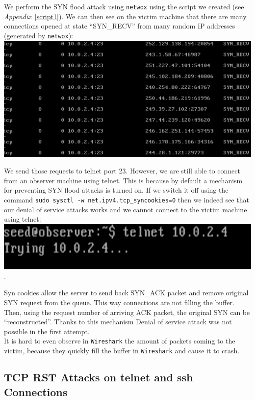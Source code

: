 \documentclass[12pt, a4paper]{article}
\begin{document}
We perform the SYN flood attack using \texttt{netwox} using the script we created (see \emph{Appendix}~\ref{script1}). We can then see on the victim machine that there are many connections opened at state ``SYN\_RECV'' from many random IP addresses (generated by \texttt{netwox}):\\
\includegraphics[width=.95\textwidth]{gfx/syn-netstat.png}

We send those requests to telnet port 23. However, we are still able to connect from an observer machine using telnet. This is because by default a mechanism for preventing SYN flood attacks is turned on. If we switch it off using the command \texttt{sudo sysctl -w net.ipv4.tcp\_syncookies=0} then we indeed see that our denial of service attacks works and we cannot connect to the victim machine using telnet:\\

\includegraphics[width=.95\textwidth]{gfx/syn-telnet.png}.

Syn cookies allow the server to send back SYN\_ACK packet and remove original SYN request from the queue. This way connections are not filling the buffer. Then, using the request number of arriving ACK packet, the original SYN can be ``reconstructed''. Thanks to this mechanism Denial of service attack was not possible in the first attempt.\\

It is hard to even observe in \texttt{Wireshark} the amount of packets coming to the victim, because they quickly fill the buffer in \texttt{Wireshark} and cause it to crash.

\subsection{TCP RST Attacks on telnet and ssh Connections}
\end{document}
